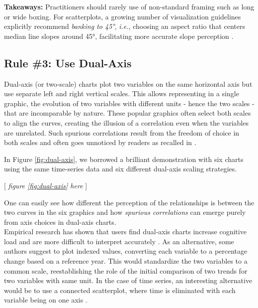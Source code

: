 \documentclass[11pt,twoside,a4paper]{article}
\begin{document}
 \noindent \textbf{ Takeaways:} Practitioners should rarely use of non-standard framing such as long or wide boxing.  For scatterplots, a growing number of visualization guidelines explicitly recommend \textit{banking to 45°}, \textit{i.e.}, choosing an aspect ratio that centers median line slopes around 45°, facilitating more accurate slope perception \citep{Sonning2023Perception}. 
 

\subsection*{Rule \#3: Use Dual-Axis}

Dual‑axis (or two‑scale) charts plot two variables on the same horizontal axis but use separate left and right vertical scales. This allows representing in a single graphic, the evolution of  two variables with different units - hence the two scales -  that are incomparable by nature. These popular graphics often select both scales to align the curves, creating the illusion of a correlation even when the variables are unrelated. Such spurious correlations result from the  freedom of choice in both scales and often goes unnoticed by readers as recalled in \citep{Vigen2015}.

In Figure \ref{fig:dual-axis}, we borrowed a brilliant demonstration  \citep{muth2018} with six charts using the same time-series data and six different dual-axis scaling strategies. 

\begin{center}
    [ \textit{figure \ref{fig:dual-axis}  here}  ]
\end{center}


One can easily see how different the  perception of the relationships is between the two curves in the six graphics  and how \textit{spurious correlations} can emerge purely from axis choices in dual-axis charts.\\

 Empirical research has shown that users find dual‑axis charts increase cognitive load and are  more difficult to interpret accurately \citep{Isenberg2011}. As an alternative, some authors \citep{few2008dual, muth2018} suggest to plot indexed values,  converting each variable to a percentage change based on a reference year. This would standardize the two variables to a common scale, reestablishing  the role of the initial comparison of two trends for two variables with same unit. In the case of time series, an interesting alternative  would be  to use a connected scatterplot, where time is eliminated with each variable being on one axis \citep{Evergreen2020Dual}.\\
\end{document}
